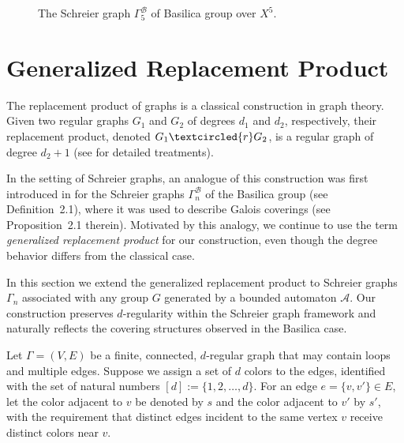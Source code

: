 \documentclass{article}
\newcommand{\A}{\mathcal{A}}
\newcommand{\B}{\mathcal{B}}
\newcommand{\G}{\Gamma}
\begin{document}
\begin{figure}[!htb]
	\caption{The Schreier graph $\G_5^{\B}$ of Basilica group over $X^5$.}
	\label{Figure:B-Sch5}
\end{figure}

\section{Generalized Replacement Product}\label{sec:replacement}

The replacement product of graphs is a classical construction in graph theory. Given two regular graphs $G_1$ and $G_2$ of degrees $d_1$ and $d_2$, respectively, their replacement product, denoted $G_1 \textcircled{r} G_2$, is a regular graph of degree $d_2+1$ (see \cite{abdollahi2013one, D'Angeli2015JGT} for detailed treatments).

In the setting of Schreier graphs, an analogue of this construction was first introduced in \cite{shaikh2016zeta} for the Schreier graphs $\G_n^{\B}$ of the Basilica group (see Definition~2.1), where it was used to describe Galois coverings (see Proposition~2.1 therein). Motivated by this analogy, we continue to use the term \emph{generalized replacement product} for our construction, even though the degree behavior differs from the classical case.

In this section we extend the generalized replacement product to Schreier graphs $\G_n$ associated with any group $G$ generated by a bounded automaton $\A$. Our construction preserves $d$-regularity within the Schreier graph framework and naturally reflects the covering structures observed in the Basilica case.


Let $\G = (V, E)$ be a finite, connected, $d$-regular graph that may contain loops and multiple edges. Suppose we assign a set of $d$ colors to the edges, identified with the set of natural numbers $[d] := \{1, 2, \dots, d\}$. For an edge $e = \{v, v'\} \in E$, let the color adjacent to $v$ be denoted by $s$ and the color adjacent to $v'$ by $s'$, with the requirement that distinct edges incident to the same vertex $v$ receive distinct colors near $v$.
\end{document}
